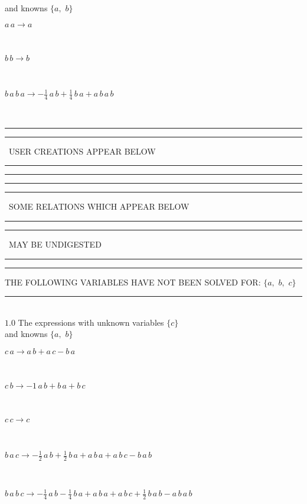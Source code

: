 \documentclass[rep10,leqno]{report}
\begin{document}
and knowns $\{a,
$ $
b\}$\smallskip\\
\begin{minipage}{6in}
$
a\,
 a\rightarrow a
$
\end{minipage}\medskip \\
\begin{minipage}{6in}
$
b\,
 b\rightarrow b
$
\end{minipage}\medskip \\
\begin{minipage}{6in}
$
b\,
 a\,
 b\,
 a\rightarrow -\frac{1}{4}\,
 a\,
 b + \frac{1}{4}\,
 b\,
 a + a\,
 b\,
 a\,
 b
$
\end{minipage}\\
\rule[2pt]{6in}{1pt}\hfil\break
\rule[2.5pt]{1.701in}{1pt}
\ USER CREATIONS APPEAR BELOW\ 
\rule[2.5pt]{1.701in}{1pt}\hfil\break
\rule[2pt]{6in}{1pt}\hfil\break
\rule[2pt]{6in}{4pt}\hfil\break
\rule[2pt]{1.45in}{4pt}
\ SOME RELATIONS WHICH APPEAR BELOW\ 
\rule[2pt]{1.45in}{4pt}\hfil\break
\rule[2pt]{2.18in}{4pt}
\ MAY BE UNDIGESTED\ 
\rule[2pt]{2.18in}{4pt}\hfil\break
\rule[2pt]{6in}{4pt}\hfil\break
THE FOLLOWING VARIABLES HAVE NOT BEEN SOLVED FOR:\hfil\break
$\{a,
$ $
b,
$ $
c\}$
\smallskip\\
\rule[3pt]{6in}{.7pt}\\
$1.0$  The expressions with unknown variables $\{c\}$\\
and knowns $\{a,
$ $
b\}$\smallskip\\
\begin{minipage}{6in}
$
c\,
 a\rightarrow a\,
 b + a\,
 c - b\,
 a
$
\end{minipage}\medskip \\
\begin{minipage}{6in}
$
c\,
 b\rightarrow -1\,
 a\,
 b + b\,
 a + b\,
 c
$
\end{minipage}\medskip \\
\begin{minipage}{6in}
$
c\,
 c\rightarrow c
$
\end{minipage}\medskip \\
\begin{minipage}{6in}
$
b\,
 a\,
 c\rightarrow -\frac{1}{2}\,
 a\,
 b + \frac{1}{2}\,
 b\,
 a + a\,
 b\,
 a + a\,
 b\,
 c - b\,
 a\,
 b
$
\end{minipage}\medskip \\
\begin{minipage}{6in}
$
b\,
 a\,
 b\,
 c\rightarrow -\frac{1}{4}\,
 a\,
 b - \frac{1}{4}\,
 b\,
 a + a\,
 b\,
 a + a\,
 b\,
 c + \frac{1}{2}\,
 b\,
 a\,
 b - a\,
 b\,
 a\,
 b
$
\end{minipage}\\
\vspace{10pt}
\end{document}
